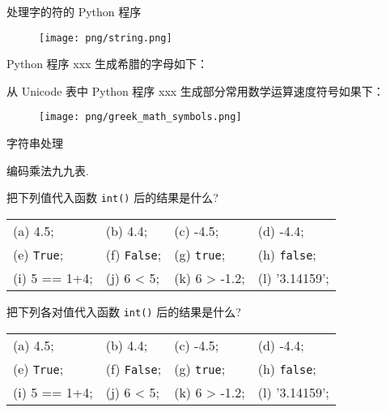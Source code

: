 \documentclass[main.tex]{subfiles}
\begin{document}
处理字的符的 Python 程序

\begin{figure}
	\texttt{[image: png/string.png]}
\end{figure}

Python 程序 xxx 生成希腊的字母如下：


从 Unicode 表中 Python 程序 xxx 生成部分常用数学运算速度符号如果下：


\begin{figure}
	\texttt{[image: png/greek\_math\_symbols.png]}
\end{figure}


字符串处理

\begin{Exercises}
	\item 编码乘法九九表.
	
	\item 把下列值代入函数 \verb|int()| 后的结果是什么?

	\begin{tabular}{l l l l} 
	(a) 4.5; & (b) 4.4;  & (c) -4.5; & (d) -4.4; \\
	(e) \verb|True|;  & (f) \verb|False|; & (g) \verb|true|;  & (h) \verb|false|; \\
	(i) 5 == 1+4;  & (j) 6 < 5; & (k) 6 > -1.2; & (l) \textsf{'}3.14159\textsf{'}; \\
	\end{tabular}
	\item 把下列各对值代入函数 \verb|int()| 后的结果是什么?

\begin{tabular}{l l l l} 
	(a) 4.5; & (b) 4.4;  & (c) -4.5; & (d) -4.4; \\
	(e) \verb|True|;  & (f) \verb|False|; & (g) \verb|true|;  & (h) \verb|false|; \\
	(i) 5 == 1+4;  & (j) 6 < 5; & (k) 6 > -1.2; & (l) \textsf{'}3.14159\textsf{'}; \\
\end{tabular}

\end{Exercises}
\end{document}
